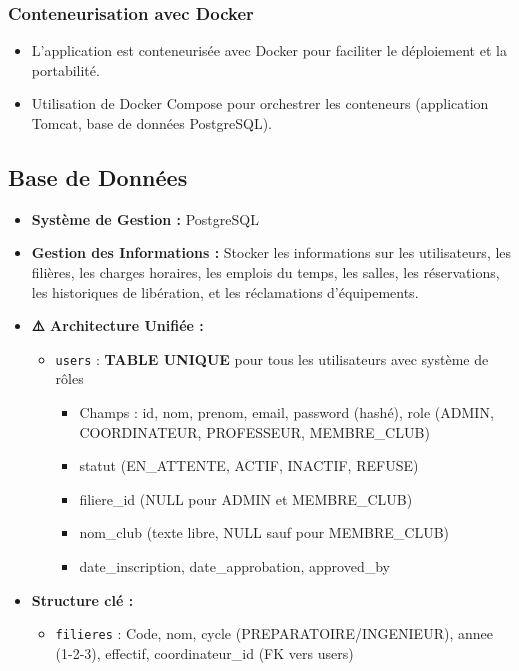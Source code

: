 \documentclass[12pt,a4paper]{article}
\begin{document}
\subsubsection{Conteneurisation avec Docker}
\begin{itemize}
    \item L'application est conteneurisée avec Docker pour faciliter le déploiement et la portabilité.
    \item Utilisation de Docker Compose pour orchestrer les conteneurs (application Tomcat, base de données PostgreSQL).
\end{itemize}

\subsection{Base de Données}
\begin{itemize}
    \item \textbf{Système de Gestion :} PostgreSQL
    \item \textbf{Gestion des Informations :} Stocker les informations sur les utilisateurs, les filières, les charges horaires, les emplois du temps, les salles, les réservations, les historiques de libération, et les réclamations d'équipements.
    \item \textbf{⚠️ Architecture Unifiée :}
    \begin{itemize}
        \item \texttt{users} : \textbf{TABLE UNIQUE} pour tous les utilisateurs avec système de rôles
        \begin{itemize}
            \item Champs : id, nom, prenom, email, password (hashé), role (ADMIN, COORDINATEUR, PROFESSEUR, MEMBRE\_CLUB)
            \item statut (EN\_ATTENTE, ACTIF, INACTIF, REFUSE)
            \item filiere\_id (NULL pour ADMIN et MEMBRE\_CLUB)
            \item nom\_club (texte libre, NULL sauf pour MEMBRE\_CLUB)
            \item date\_inscription, date\_approbation, approved\_by
        \end{itemize}
    \end{itemize}
    \item \textbf{Structure clé :}
    \begin{itemize}
        \item \texttt{filieres} : Code, nom, cycle (PREPARATOIRE/INGENIEUR), annee (1-2-3), effectif, coordinateur\_id (FK vers users)

\end{itemize}
\end{itemize}
\end{document}
